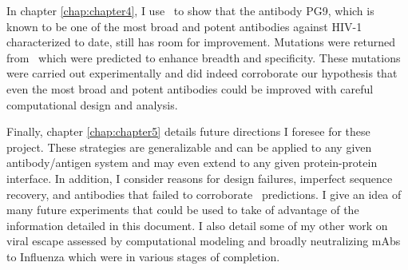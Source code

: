 In chapter \ref{chap:chapter4}, I use \rosettadesign~to show that the antibody PG9, which is known to be one of the most broad and potent antibodies against HIV-1 characterized to date, still has room for improvement. Mutations were returned from \rosettadesign~which were predicted to enhance breadth and specificity. These mutations were carried out experimentally and did indeed corroborate our hypothesis that even the most broad and potent antibodies could be improved with careful computational design and analysis.

Finally, chapter \ref{chap:chapter5} details future directions I foresee for these project. These strategies are generalizable and can be applied to any given antibody/antigen system and may even extend to any given protein-protein interface. In addition, I consider reasons for design failures, imperfect sequence recovery, and antibodies that failed to corroborate \silico~predictions. I give an idea of many future experiments that could be used to take of advantage of the information detailed in this document. I also detail  some of my other work on viral escape assessed by computational modeling and broadly neutralizing mAbs to Influenza which were in various stages of completion.